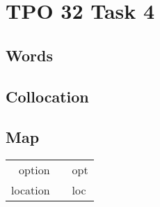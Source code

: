 \section{TPO 32 Task 4}

\subsection{Words}

\subsection{Collocation}

\subsection{Map}

\begin{tabular}{rc@{\quad$\to$\quad}l}
    option   &  & opt \\
    location &  & loc \\
\end{tabular}
